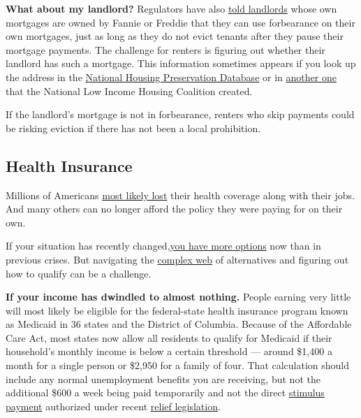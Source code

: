 \textbf{What about my landlord?} Regulators have also
\href{https://www.fhfa.gov/Media/PublicAffairs/Pages/FHFA-Moves-to-Provide-Eviction-Suspension-Relief-for-Renters-in-Multifamily-Properties.aspx}{told
landlords} whose own mortgages are owned by Fannie or Freddie that they
can use forbearance on their own mortgages, just as long as they do not
evict tenants after they pause their mortgage payments. The challenge
for renters is figuring out whether their landlord has such a mortgage.
This information sometimes appears if you look up the address in the
\href{https://preservationdatabase.org/about-the-database/}{National
Housing Preservation Database} or in
\href{https://nlihc.org/federal-moratoriums}{another one} that the
National Low Income Housing Coalition created.

If the landlord's mortgage is not in forbearance, renters who skip
payments could be risking eviction if there has not been a local
prohibition.

\hypertarget{health-insurance}{%
\subsection{Health Insurance}\label{health-insurance}}

Millions of Americans
\href{https://www.kff.org/coronavirus-covid-19/issue-brief/eligibility-for-aca-health-coverage-following-job-loss/}{most
likely lost} their health coverage along with their jobs. And many
others can no longer afford the policy they were paying for on their
own.

If your situation has recently
changed,\href{https://www.nytimes3xbfgragh.onion/2020/03/25/upshot/coronavirus-health-insurance-faq.html}{you
have more options} now than in previous crises. But navigating the
\href{https://www.kff.org/health-reform/issue-brief/changes-in-income-and-health-coverage-eligibility-after-job-loss-due-to-covid-19/}{complex
web} of alternatives and figuring out how to qualify can be a challenge.

\textbf{If your income has dwindled to almost nothing.} People earning
very little will most likely be eligible for the federal-state health
insurance program known as Medicaid in 36 states and the District of
Columbia. Because of the Affordable Care Act, most states now allow all
residents to qualify for Medicaid if their household's monthly income is
below a certain threshold --- around \$1,400 a month for a single person
or \$2,950 for a family of four. That calculation should include any
normal unemployment benefits you are receiving, but not the additional
\$600 a week being paid temporarily and not the direct
\href{https://www.nytimes3xbfgragh.onion/2020/09/10/us/politics/second-stimulus-check.html}{stimulus
payment} authorized under recent
\href{https://www.nytimes3xbfgragh.onion/article/coronavirus-stimulus-package-questions-answers.html}{relief
legislation}.


